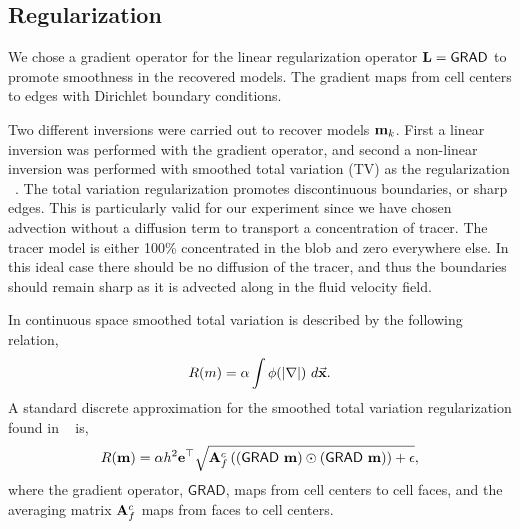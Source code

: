 \documentclass[11pt]{article}
\newcommand{\bfA}	{{\bf{A}}}
\newcommand{\bfL}	{{\bf{L}}}
\newcommand{\bfe}	{{\bf{e}}}
\newcommand{\bfm}	{{\bf{m}}}
\newcommand {\vx}    {\vec {\bf x}}
\newcommand{\grad}	{\ensuremath {{\bf{ \nabla}}}}
\newcommand{\GRADh}  {{\textsf{GRAD}}} %
\begin{document}
\subsection{Regularization}
We chose a gradient operator for the linear regularization operator $\bfL = \GRADh$ to promote smoothness in the recovered models. The gradient maps from cell centers to edges with Dirichlet boundary conditions.

Two different inversions were carried out to recover models $\bfm_k$. First a linear inversion was performed with the gradient operator, and second a non-linear inversion was performed with smoothed total variation (TV) as the  regularization ~\cite{Ascher2006}. The total variation regularization promotes discontinuous boundaries, or sharp edges. This is particularly valid for our experiment since we have chosen advection without a diffusion term to transport a concentration of tracer. The tracer model is either 100\% concentrated in the blob and zero everywhere else. In this ideal case there should be no diffusion of the tracer, and thus the boundaries should remain sharp as it is advected along in the fluid velocity field.

In continuous space smoothed total variation is described by the following relation,
\begin{equation}
		R(m) = \alpha \int  \phi(|\grad |) \ d\vx.
\end{equation} 
A standard discrete 
approximation for the smoothed total variation regularization found in ~\cite{Ascher2006} is, 
\begin{equation}
\label{regsd}
R(\bfm) = \alpha h^2 \bfe^{\top} \sqrt{ \bfA_{f}^{c} \left( (\GRADh\ \bfm) \odot (\GRADh\ \bfm) \right)  + \epsilon},
\end{equation}
where the  gradient operator, $\GRADh$,   maps from cell centers to cell faces, and the averaging matrix $\bfA_{f}^{c}$ maps from faces to cell centers. 
\end{document}

